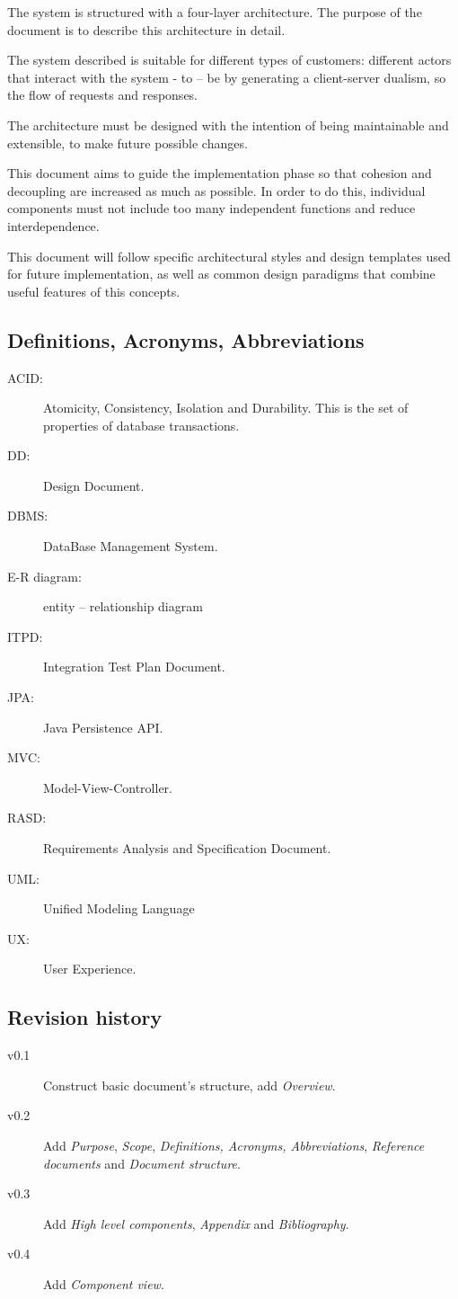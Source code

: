 \documentclass{article}
\begin{document}
	The system is structured with a four-layer architecture. The purpose of the document is to describe this architecture in detail.

	\bigskip
	The system described is suitable for different types of customers: different actors that interact with the system - to – be by generating a client-server dualism, so the flow of requests and responses.
	
	The architecture must be designed with the intention of being maintainable and extensible, to make future possible changes.
	
	\bigskip
	This document aims to guide the implementation phase so that cohesion and decoupling are increased as much as possible. In order to do this, individual components must not include too many independent functions and reduce interdependence.
	
	This document will follow specific architectural styles and design templates used for future implementation, as well as common design paradigms that combine useful features of this concepts.


	
	\subsection{Definitions, Acronyms, Abbreviations}
	\begin{description}
	\item[ACID:] Atomicity, Consistency, Isolation and Durability. This is the set of properties of database transactions.
	\item[DD:] Design Document.
	\item[DBMS:] DataBase Management System.
	\item[E-R diagram:] entity – relationship diagram
	\item[ITPD:] Integration Test Plan Document.
	\item[JPA:] Java Persistence API.
	\item[MVC:] Model-View-Controller.
	\item[RASD:] Requirements Analysis and Specification Document.
	\item[UML:] Unified Modeling Language
	\item[UX:] User Experience.
	\end{description}
	
	
	\subsection{Revision history}
	\begin{description}
		\item[v0.1] Construct basic document's structure, add \textit{Overview}.
		\item[v0.2] Add \textit{Purpose}, \textit{Scope}, \textit{Definitions, Acronyms, Abbreviations}, \textit{Reference documents} and \textit{Document structure}.
		\item[v0.3] Add \textit{High level components}, \textit{Appendix} and \textit{Bibliography}.
		\item[v0.4] Add \textit{Component view}.
	\end{description}
	
\end{document}
